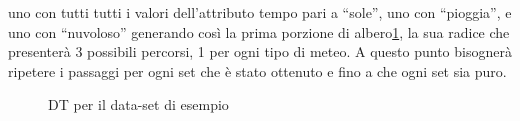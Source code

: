 uno con tutti tutti i valori dell'attributo tempo pari a ``sole'', uno con ``pioggia'', e uno con ``nuvoloso'' generando così la prima porzione di albero\ref{figure:DT_start}, la sua radice che presenterà 3 possibili percorsi, 1 per ogni tipo di meteo. A questo punto bisognerà ripetere i passaggi per ogni set che è stato ottenuto e fino a che ogni set sia puro.

\begin{figure}
	\begin{center}
	\end{center}
\caption{DT per il data-set di esempio}
\label{figure:DT_start}
\end{figure}


